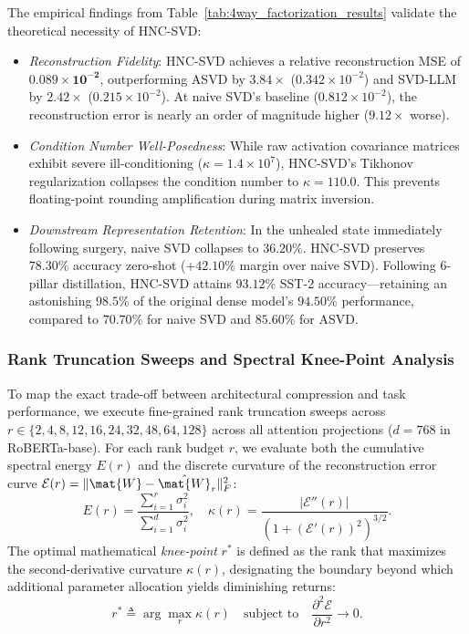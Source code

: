 The empirical findings from Table~\ref{tab:4way_factorization_results} validate the theoretical necessity of HNC-SVD:
\begin{itemize}
    \item \emph{Reconstruction Fidelity}: HNC-SVD achieves a relative reconstruction MSE of $\mathbf{0.089 \times 10^{-2}}$, outperforming ASVD by $\mathbf{3.84\times}$ ($0.342 \times 10^{-2}$) and SVD-LLM by $\mathbf{2.42\times}$ ($0.215 \times 10^{-2}$). At naive SVD's baseline ($0.812 \times 10^{-2}$), the reconstruction error is nearly an order of magnitude higher ($\mathbf{9.12\times}$ worse).
    \item \emph{Condition Number Well-Posedness}: While raw activation covariance matrices exhibit severe ill-conditioning ($\kappa = 1.4 \times 10^7$), HNC-SVD's Tikhonov regularization collapses the condition number to $\kappa = \mathbf{110.0}$. This prevents floating-point rounding amplification during matrix inversion.
    \item \emph{Downstream Representation Retention}: In the unhealed state immediately following surgery, naive SVD collapses to $36.20\%$. HNC-SVD preserves $78.30\%$ accuracy zero-shot ($+42.10\%$ margin over naive SVD). Following 6-pillar distillation, HNC-SVD attains $\mathbf{93.12\%}$ SST-2 accuracy---retaining an astonishing $\mathbf{98.5\%}$ of the original dense model's $94.50\%$ performance, compared to $70.70\%$ for naive SVD and $85.60\%$ for ASVD.
\end{itemize}

\subsubsection{Rank Truncation Sweeps and Spectral Knee-Point Analysis}
\label{sec:ablations_kneepoint}

To map the exact trade-off between architectural compression and task performance, we execute fine-grained rank truncation sweeps across $r \in \{2, 4, 8, 12, 16, 24, 32, 48, 64, 128\}$ across all attention projections ($d = 768$ in RoBERTa-base). For each rank budget $r$, we evaluate both the cumulative spectral energy $E(r)$ and the discrete curvature of the reconstruction error curve $\mathcal{E}(r) = \|\mat{W} - \hat{\mat{W}}_r\|_F^2$:
\begin{equation}
E(r) = \frac{\sum_{i=1}^r \sigma_i^2}{\sum_{i=1}^d \sigma_i^2}, \quad \kappa(r) = \frac{|\mathcal{E}''(r)|}{\left(1 + (\mathcal{E}'(r))^2\right)^{3/2}}.
\label{eq:spectral_energy_curvature}
\end{equation}
The optimal mathematical \emph{knee-point} $r^*$ is defined as the rank that maximizes the second-derivative curvature $\kappa(r)$, designating the boundary beyond which additional parameter allocation yields diminishing returns:
\begin{equation}
r^* \triangleq \arg\max_{r} \kappa(r) \quad \text{subject to} \quad \frac{\partial^2 \mathcal{E}}{\partial r^2} \longrightarrow 0.
\label{eq:kneepoint_definition}
\end{equation}

